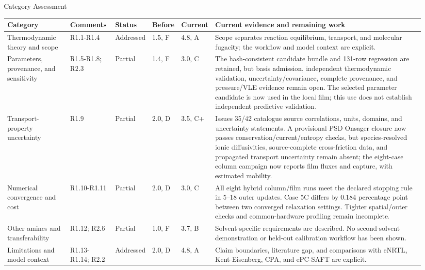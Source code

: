 \documentclass[10pt,landscape,letterpaper]{article}
\newcommand{\status}[2]{\textcolor{#1}{#2}}
\begin{document}
\vspace{7pt}
{\color{navy}\Large Category Assessment\par}
\vspace{2pt}
\small
\begin{tabularx}{\linewidth}{@{}P{1.45in}P{0.84in}P{0.76in}P{0.46in}P{0.56in}Y@{}}
\toprule
\textbf{Category} & \textbf{Comments} & \textbf{Status} & \textbf{Before} & \textbf{Current} & \textbf{Current evidence and remaining work}\\
\midrule
Thermodynamic theory and scope & R1.1-R1.4 & \status{green!50!black}{Addressed} & 1.5, F & 4.8, A & Scope separates reaction equilibrium, transport, and molecular fugacity; the workflow and model context are explicit.\\[2pt]
Parameters, provenance, and sensitivity & R1.5-R1.8; R2.3 & \status{partial}{Partial} & 1.4, F & 3.0, C & The hash-consistent candidate bundle and 131-row regression are retained, but basis admission, independent thermodynamic validation, uncertainty/covariance, complete provenance, and pressure/VLE evidence remain open. The selected parameter candidate is now used in the local film; this use does not establish independent predictive validation.\\[2pt]
Transport-property uncertainty & R1.9 & \status{partial}{Partial} & 2.0, D & 3.5, C+ & Issues 35/42 catalogue source correlations, units, domains, and uncertainty statements. A provisional PSD Onsager closure now passes conservation/current/entropy checks, but species-resolved ionic diffusivities, source-complete cross-friction data, and propagated transport uncertainty remain absent; the eight-case column campaign now reports film fluxes and capture, with estimated mobility.\\[2pt]
Numerical convergence and cost & R1.10-R1.11 & \status{partial}{Partial} & 2.0, D & 3.0, C & All eight hybrid column/film runs meet the declared stopping rule in 5--18 outer updates. Case 5C differs by 0.184 percentage point between two converged relaxation settings. Tighter spatial/outer checks and common-hardware profiling remain incomplete.\\[2pt]
Other amines and transferability & R1.12; R2.6 & \status{partial}{Partial} & 1.0, F & 3.7, B & Solvent-specific requirements are described. No second-solvent demonstration or held-out calibration workflow has been shown.\\[2pt]
Limitations and model context & R1.13-R1.14; R2.2 & \status{green!50!black}{Addressed} & 2.0, D & 4.8, A & Claim boundaries, literature gap, and comparisons with eNRTL, Kent-Eisenberg, CPA, and ePC-SAFT are explicit.\\[2pt]

\end{tabularx}
\end{document}
